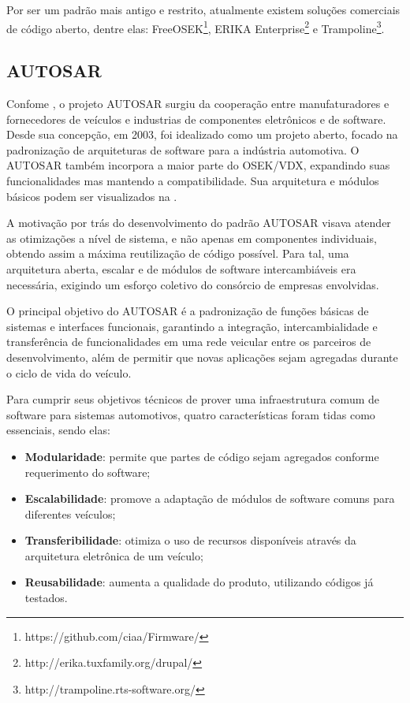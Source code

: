 Por ser um padrão mais antigo e restrito, atualmente existem soluções comerciais de código aberto, dentre elas: FreeOSEK\footnote{https://github.com/ciaa/Firmware/}, ERIKA Enterprise\footnote{http://erika.tuxfamily.org/drupal/} e Trampoline\footnote{http://trampoline.rts-software.org/}.

\subsection{AUTOSAR}

Confome , o projeto AUTOSAR surgiu da cooperação entre manufaturadores e fornecedores de veículos e industrias de componentes eletrônicos e de software. Desde sua concepção, em 2003, foi idealizado como um projeto aberto, focado na padronização de arquiteturas de software para a indústria automotiva. O AUTOSAR também incorpora a maior parte do OSEK/VDX, expandindo suas funcionalidades mas mantendo a compatibilidade. Sua arquitetura e módulos básicos podem ser visualizados na .


A motivação por trás do desenvolvimento do padrão AUTOSAR visava atender as otimizações a nível de sistema, e não apenas em componentes individuais, obtendo assim a máxima reutilização de código possível. Para tal, uma arquitetura aberta, escalar e de módulos de software intercambiáveis era necessária, exigindo um esforço coletivo do consórcio de empresas envolvidas.

O principal objetivo do AUTOSAR é a padronização de funções básicas de sistemas e interfaces funcionais, garantindo a integração, intercambialidade e transferência de funcionalidades em uma rede veicular entre os parceiros de desenvolvimento, além de permitir que novas aplicações sejam agregadas durante o ciclo de vida do veículo.


Para cumprir seus objetivos técnicos de prover uma infraestrutura comum de software para sistemas automotivos, quatro características foram tidas como essenciais, sendo elas:

\begin{itemize}
	\item \textbf{Modularidade}: permite que partes de código sejam agregados conforme requerimento do software;
	\item \textbf{Escalabilidade}: promove a adaptação de módulos de software comuns para diferentes veículos;
	\item \textbf{Transferibilidade}: otimiza o uso de recursos disponíveis através da arquitetura eletrônica de um veículo;
	\item \textbf{Reusabilidade}: aumenta a qualidade do produto, utilizando códigos já testados.
\end{itemize}
